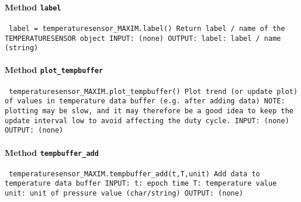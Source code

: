 \paragraph{Method \texttt{label}}
\vspace{1ex}
\texttt{\newline
label = temperaturesensor_MAXIM.label()\newline
\newline
Return label / name of the TEMPERATURESENSOR object\newline
\newline
INPUT:\newline
(none)\newline
\newline
OUTPUT:\newline
label: label / name (string)\newline
\newline
}

\paragraph{Method \texttt{plot_tempbuffer}}
\vspace{1ex}
\texttt{\newline
temperaturesensor_MAXIM.plot_tempbuffer()\newline
\newline
Plot trend (or update plot) of values in temperature data buffer (e.g. after adding data)\newline
NOTE: plotting may be slow, and it may therefore be a good idea to keep the update interval low to avoid affecting the duty cycle.\newline
\newline
INPUT:\newline
(none)\newline
\newline
OUTPUT:\newline
(none)\newline
\newline
}

\paragraph{Method \texttt{tempbuffer_add}}
\vspace{1ex}
\texttt{\newline
temperaturesensor_MAXIM.tempbuffer_add(t,T,unit)\newline
\newline
Add data to temperature data buffer\newline
\newline
INPUT:\newline
t: epoch time\newline
T: temperature value\newline
unit: unit of pressure value (char/string)\newline
\newline
OUTPUT:\newline
(none)\newline
\newline
}

